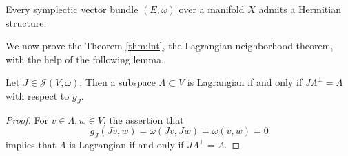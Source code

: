 \documentclass{amsart}
\begin{document}
\begin{theorem}
    Every symplectic vector bundle $(E,\omega)$ over a manifold $X$ admits a
    Hermitian structure.
    \label{thm:herm}
\end{theorem}

We now prove the Theorem \ref{thm:lnt}, the Lagrangian neighborhood theorem, with the help
of the following lemma.

\begin{lemma}
    Let $J\in\mathcal{J}(V,\omega)$. Then a subspace $\Lambda\subset V$ is Lagrangian
    if and only if $J\Lambda^\perp=\Lambda$ with respect to $g_J$.
\end{lemma}
\begin{proof}
    For $v\in\Lambda,w\in V$, the assertion that
    \begin{equation*}
        g_J(Jv,w)=\omega(Jv,Jw)=\omega(v,w)=0
    \end{equation*}
    implies that $\Lambda$ is Lagrangian if and only if $J\Lambda^\perp=\Lambda$.
\end{proof}
\end{document}
